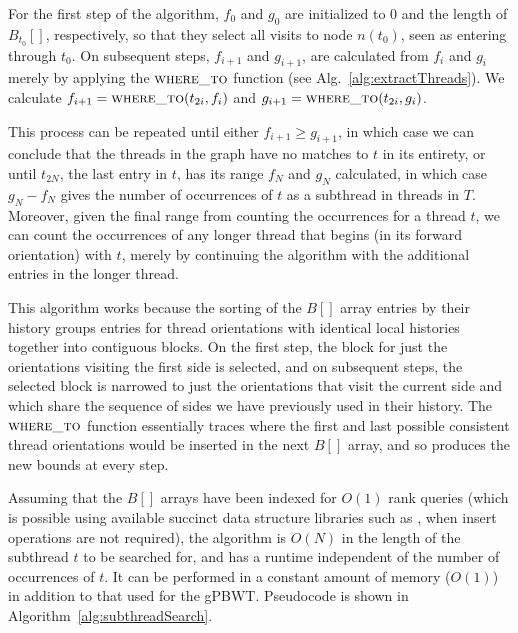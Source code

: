 For the first step of the algorithm, $f_0$ and $g_0$ are initialized to $0$ and the length of $B_{t_0}[]$, respectively, so that they select all visits to node $n(t_0)$, seen as entering through $t_0$. On subsequent steps, $f_{i+1}$ and $g_{i+1}$, are calculated from $f_i$ and $g_i$ merely by applying the $\Call{where\_to}{}$ function (see Alg.~\ref{alg:extractThreads}). We calculate $f_{i+1} = \Call{where\_to}{t_{2i}, f_i}$ and $g_{i+1} = \Call{where\_to}{t_{2i}, g_i}$.

This process can be repeated until either $f_{i+1} \geq g_{i+1}$, in which case we can conclude that the threads in the graph have no matches to $t$ in its entirety, or until $t_{2N}$, the last entry in $t$, has its range $f_N$ and $g_N$ calculated, in which case $g_N - f_N$ gives the number of occurrences of $t$ as a subthread in threads in $T$. Moreover, given the final range from counting the occurrences for a thread $t$, we can count the occurrences of any longer thread that begins (in its forward orientation) with $t$, merely by continuing the algorithm with the additional entries in the longer thread.

This algorithm works because the sorting of the $B[]$ array entries by their history groups entries for thread orientations with identical local histories together into contiguous blocks. On the first step, the block for just the orientations visiting the first side is selected, and on subsequent steps, the selected block is narrowed to just the orientations that visit the current side and which share the sequence of sides we have previously used in their history. The $\Call{where\_to}{}$ function essentially traces where the first and last possible consistent thread orientations would be inserted in the next $B[]$ array, and so produces the new bounds at every step.

Assuming that the $B[]$ arrays have been indexed for $O(1)$ rank queries (which is possible using available succinct data structure libraries such as \cite{gog2014theory}, when insert operations are not required), the algorithm is $O(N)$ in the length of the subthread $t$ to be searched for, and has a runtime independent of the number of occurrences of $t$. It can be performed in a constant amount of memory ($O(1)$) in addition to that used for the gPBWT. Pseudocode is shown in Algorithm~\ref{alg:subthreadSearch}.

